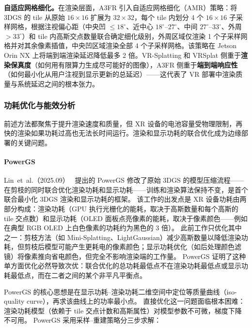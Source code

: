\textbf{自适应网格细化。}在渲染层面，A3FR 引入自适应网格细化（AMR）策略：将 3DGS 的 tile 从原始 $16 \times 16$ 扩展为 $32 \times 32$，每个 tile 内划分 4 个 $16 \times 16$ 子采样网格，根据注视偏心距（中央凹 $\leq 18^\circ$、近中心 $18^\circ$--$27^\circ$、中间 $27^\circ$--$33^\circ$、外周 $> 33^\circ$）和 tile 内高斯交点数量联合确定细化级别，外周区域仅渲染 1 个子采样网格并对其余像素插值，中央凹区域渲染全部 4 个子采样网格。该策略在 Jetson Orin NX 上将端到端渲染延迟降低最多 2 倍。VR-Splatting 和 VRSplat 侧重于\textbf{渲染保真度}（如何用有限算力生成尽可能好的图像），A3FR 侧重于\textbf{端到端响应性}（如何最小化从用户注视到显示更新的总延迟）——这代表了 VR 部署中渲染质量与系统延迟之间的根本张力。

\subsubsection{功耗优化与能效分析}

前述方法都聚焦于提升渲染速度和质量，但 XR 设备的电池容量受物理限制，再快的渲染如果功耗过高也无法长时间运行。渲染和显示功耗的联合优化成为边缘部署的关键问题。

\paragraph{PowerGS}
Lin~et~al.（2025.09）~\cite{2509_21702} 提出的 PowerGS 修改了原始 3DGS 的模型压缩流程——在剪枝的同时联合优化渲染功耗和显示功耗——训练和渲染算法保持不变，是首个联合最小化 3DGS 渲染和显示功耗的框架。
该工作的出发点是 XR 设备功耗由两部分构成：渲染功耗（GPU 执行光栅化的能耗，取决于高斯数量和每个高斯的 tile 交点数）和显示功耗（OLED 面板点亮像素的能耗，取决于像素颜色——例如在典型 RGB OLED 上白色像素的功耗约为黑色的 3 倍）。
此前工作只优化其中之一：剪枝方法（如 Mini-Splatting、LightGaussian）减少高斯数量以降低渲染功耗，但剪枝后模型可能产生更耗电的像素颜色；显示功耗优化（如后处理颜色滤镜）将像素推向省电颜色，但完全不影响渲染端的工作量。
PowerGS 证明了这种单方面优化必然导致次优：联合优化的总功耗最低点不在渲染功耗最低点或显示功耗最低点，而在二者之间的某个非平凡平衡点。

PowerGS 的核心思想是在显示功耗--渲染功耗二维空间中定位等质量曲线（iso-quality curve），再求该曲线上的功率最小点。
直接优化这一问题面临根本困难：渲染功耗模型（依赖于 tile 交点计数和高斯属性）对模型参数不可微，梯度下降不可用。
PowerGS 采用采样--重建策略分三步求解：

